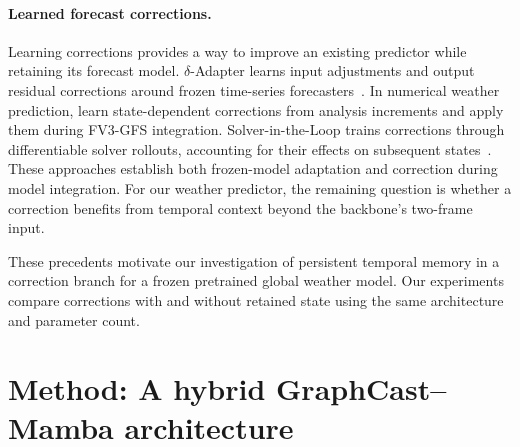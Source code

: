 \documentclass{article}
\newcommand{\suozhi}[1]{}
\renewcommand{\suozhi}[1]{}
\begin{document}
\paragraph{Learned forecast corrections.}
Learning corrections provides a way to improve an existing predictor while retaining its forecast model. $\delta$-Adapter learns input adjustments and output residual corrections around frozen time-series forecasters~\citep{liang2026forecast}. In numerical weather prediction, \citet{chen2022correcting} learn state-dependent corrections from analysis increments and apply them during FV3-GFS integration. Solver-in-the-Loop trains corrections through differentiable solver rollouts, accounting for their effects on subsequent states~\citep{um2020solver}. These approaches establish both frozen-model adaptation and correction during model integration. For our weather predictor, the remaining question is whether a correction benefits from temporal context beyond the backbone's two-frame input.

These precedents motivate our investigation of persistent temporal memory in a correction branch for a frozen pretrained global weather model. Our experiments compare corrections with and without retained state using the same architecture and parameter count.
\par
\endgroup




\section{Method: A hybrid GraphCast--Mamba architecture}

\end{document}
